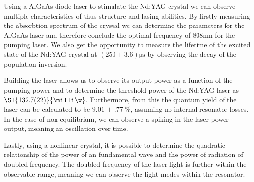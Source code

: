 \documentclass[../main.tex]{subfiles}
\begin{document}

Using a AlGaAs diode laser to stimulate the Nd:YAG crystal we can observe multiple characteristics of thus structure and lasing abilities. By firstly measuring the absorbtion spectrum of the crystal we can determine the parameters for the AlGaAs laser and therefore conclude the optimal frequency of $808\si{\nm}$ for the pumping laser. We also get the opportunity to measure the lifetime of the excited state of the Nd:YAG crystal at $(250\pm 3.6)\si{\micro\s}$ by observing the decay of the population inversion.

Building the laser allows us to observe its output power as a function of the pumping power and to determine the threshold power of the Nd:YAG laser as $\SI{132.7(22)}{\milli\w}$. Furthermore, from this the quantum yield of the laser can be calculated to be $\SI{9.01(77)}{\percent}$, assuming no internal resonator losses. In the case of non-equilibrium, we can observe a spiking in the laser power output, meaning an oscillation over time.

Lastly, using a nonlinear crystal, it is possible to determine the quadratic relationship of the power of an fundamental wave and the power of radiation of doubled frequency. The doubled frequency of the laser light is further within the observable range, meaning we can observe the light modes within the resonator.
\end{document}
